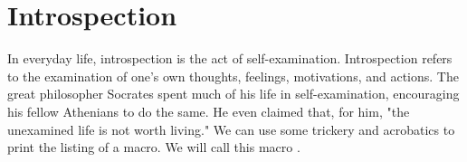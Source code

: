 \begin{comment}
%
%
%
%
%
%
%
%
%
%
%
%
%

\end{comment}




\section*{Introspection}
In everyday life, introspection is the act of self-examination. Introspection refers to the examination of one's own thoughts, feelings, motivations, and actions. The great philosopher Socrates spent much of his life in self-examination, encouraging his fellow Athenians to do the same. He even claimed that, for him, "the unexamined life is not worth living." We can use some \tex trickery and \latex acrobatics to print the listing of a macro. We will call this macro .

\begin{teX}
\def\reflect{\@star@or@long\accommand}
\def\accommand#1{\string#1:%
  \expandafter\strip@prefix\meaning#1} 
\end{teX}

